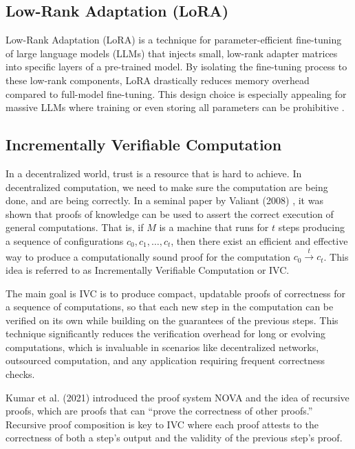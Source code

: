 \documentclass[11pt]{article}
\begin{document}
\subsection{Low-Rank Adaptation (LoRA)}

Low-Rank Adaptation (LoRA) \cite{hu2021lora} is a technique for parameter-efficient fine-tuning of large language models (LLMs) that injects small, low-rank adapter matrices into specific layers of a pre-trained model. By isolating the fine-tuning process to these low-rank components, LoRA drastically reduces memory overhead compared to full-model fine-tuning. This design choice is especially appealing for massive LLMs where training or even storing all parameters can be prohibitive \cite{ding2022delta}.


\subsection{Incrementally Verifiable Computation}
In a decentralized world, trust is a resource that is hard to achieve. In decentralized computation, we need to make sure the computation are being done, and are being correctly. In a seminal paper by Valiant (2008) \cite{valiant2008incrementally}, it was shown that proofs of knowledge can be used to assert the correct execution of general computations. That is, if $M$ is a machine that runs for $t$ steps producing a sequence of configurations $c_0,c_1,\dots,c_t$, then there exist an efficient and effective way to produce a computationally sound proof for the computation $c_0  \xrightarrow{t} c_t$. This idea is referred to as Incrementally Verifiable Computation or IVC.

The main goal is IVC is to produce compact, updatable proofs of correctness for a sequence of computations, so that each new step in the computation can be verified on its own while building on the guarantees of the previous steps. This technique significantly reduces the verification overhead for long or evolving computations, which is invaluable in scenarios like decentralized networks, outsourced computation, and any application requiring frequent correctness checks.

Kumar et al. (2021) \cite{kothapalli2022nova} introduced the proof system NOVA and the idea of recursive proofs, which are proofs that can ``prove the correctness of other proofs.'' Recursive proof composition is key to IVC where each proof attests to the correctness of both a step’s output and the validity of the previous step’s proof.
\end{document}
